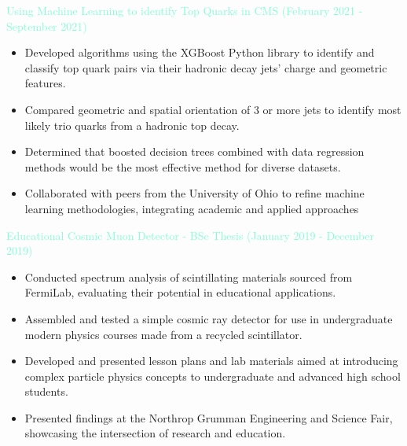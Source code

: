 \documentclass[10pt,a4paper,ragged2e,withhyper]{altacv}
\begin{document}
\begin{paracol}{2}
\begin{itemize}
\end{itemize}



\textcolor{Aquamarine}{Using Machine Learning to identify Top Quarks in CMS (February 2021 - September 2021)}
\begin{itemize}
    \item Developed algorithms using the XGBoost Python library to identify and classify top quark pairs via their hadronic decay jets’ charge and geometric features. 
    \item Compared geometric and spatial orientation of 3 or more jets to identify most likely trio quarks from a hadronic top decay.
    \item Determined that boosted decision trees combined with data regression methods would be the most effective method for diverse datasets.
    \item Collaborated with peers from the University of Ohio to refine machine learning methodologies, integrating academic and applied approaches

\end{itemize}
\textcolor{Aquamarine}{Educational Cosmic Muon Detector - BSc Thesis (January 2019 - December 2019)}
\smallskip
\begin{itemize}
    \item Conducted spectrum analysis of scintillating materials sourced from FermiLab, evaluating their potential in educational applications. 
    \item Assembled and tested a simple cosmic ray detector for use in undergraduate modern physics courses made from a recycled scintillator. 
    \item Developed and presented lesson plans and lab materials aimed at introducing complex particle physics concepts to undergraduate and advanced high school students. 
    \item Presented findings at the Northrop Grumman Engineering and Science Fair, showcasing the intersection of research and education.


\end{itemize}
\end{paracol}
\end{document}
